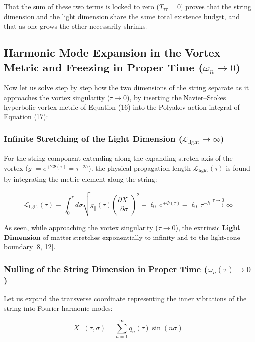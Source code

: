 \documentclass[12pt,a4paper]{article}
\begin{document}
That the sum of these two terms is locked to zero ($T_{\tau\tau} = 0$) proves that the string dimension and the light dimension share the same total existence budget, and that as one grows the other necessarily shrinks.

\subsection{Harmonic Mode Expansion in the Vortex Metric and Freezing in Proper Time ($\omega_n \to 0$)}

Now let us solve step by step how the two dimensions of the string separate as it approaches the vortex singularity ($\tau \to 0$), by inserting the Navier--Stokes hyperbolic vortex metric of Equation (16) into the Polyakov action integral of Equation (17):

\subsubsection{Infinite Stretching of the Light Dimension ($\mathcal{L}_{\text{light}} \to \infty$)}
For the string component extending along the expanding stretch axis of the vortex ($g_{\parallel} = e^{+2\Phi(\tau)} = \tau^{-2h}$), the physical propagation length $\mathcal{L}_{\text{light}}(\tau)$ is found by integrating the metric element along the string:

\begin{equation}
\mathcal{L}_{\text{light}}(\tau) = \int_0^\pi d\sigma \sqrt{g_{\parallel}(\tau) \left(\frac{\partial X^\parallel}{\partial \sigma}\right)^2} = \ell_0 \, e^{+\Phi(\tau)} = \ell_0 \, \tau^{-h} \xrightarrow{\tau \to 0} \infty
\end{equation}

As seen, while approaching the vortex singularity ($\tau \to 0$), the extrinsic \textbf{Light Dimension} of matter stretches exponentially to infinity and to the light-cone boundary [8, 12].

\subsubsection{Nulling of the String Dimension in Proper Time ($\omega_n(\tau) \to 0$)}
Let us expand the transverse coordinate representing the inner vibrations of the string into Fourier harmonic modes:

\begin{equation}
X^\perp(\tau, \sigma) = \sum_{n=1}^{\infty} q_n(\tau) \sin(n \sigma)
\end{equation}
\end{document}

